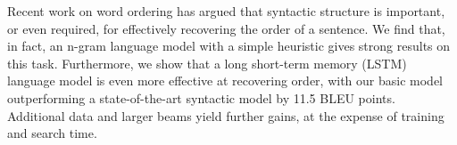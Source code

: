 Recent work on word ordering has argued that syntactic structure is important, or even required, for effectively recovering the order of a sentence. We find that, in fact, an n-gram language model with a simple heuristic gives strong results on this task. Furthermore, we show that a long short-term memory (LSTM) language model is even more effective at recovering order, with our basic model outperforming a state-of-the-art syntactic model by 11.5 BLEU points. Additional data and larger beams yield further gains, at the expense of training and search time.
